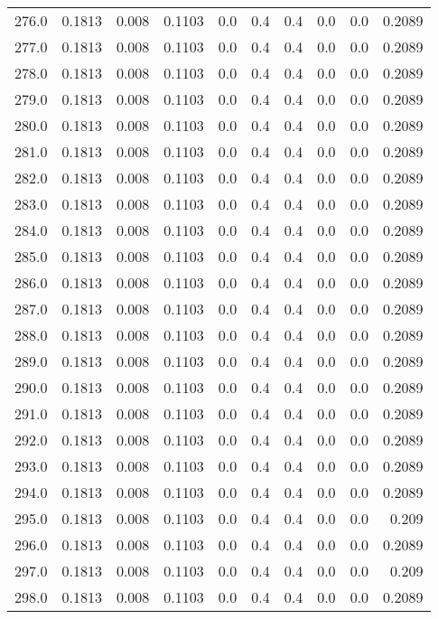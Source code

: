 \begin{longtable}{lrrrrrrrrr}
276.0 & 0.1813 & 0.008 & 0.1103 & 0.0 & 0.4 & 0.4 & 0.0 & 0.0 & 0.2089 \\
277.0 & 0.1813 & 0.008 & 0.1103 & 0.0 & 0.4 & 0.4 & 0.0 & 0.0 & 0.2089 \\
278.0 & 0.1813 & 0.008 & 0.1103 & 0.0 & 0.4 & 0.4 & 0.0 & 0.0 & 0.2089 \\
279.0 & 0.1813 & 0.008 & 0.1103 & 0.0 & 0.4 & 0.4 & 0.0 & 0.0 & 0.2089 \\
280.0 & 0.1813 & 0.008 & 0.1103 & 0.0 & 0.4 & 0.4 & 0.0 & 0.0 & 0.2089 \\
281.0 & 0.1813 & 0.008 & 0.1103 & 0.0 & 0.4 & 0.4 & 0.0 & 0.0 & 0.2089 \\
282.0 & 0.1813 & 0.008 & 0.1103 & 0.0 & 0.4 & 0.4 & 0.0 & 0.0 & 0.2089 \\
283.0 & 0.1813 & 0.008 & 0.1103 & 0.0 & 0.4 & 0.4 & 0.0 & 0.0 & 0.2089 \\
284.0 & 0.1813 & 0.008 & 0.1103 & 0.0 & 0.4 & 0.4 & 0.0 & 0.0 & 0.2089 \\
285.0 & 0.1813 & 0.008 & 0.1103 & 0.0 & 0.4 & 0.4 & 0.0 & 0.0 & 0.2089 \\
286.0 & 0.1813 & 0.008 & 0.1103 & 0.0 & 0.4 & 0.4 & 0.0 & 0.0 & 0.2089 \\
287.0 & 0.1813 & 0.008 & 0.1103 & 0.0 & 0.4 & 0.4 & 0.0 & 0.0 & 0.2089 \\
288.0 & 0.1813 & 0.008 & 0.1103 & 0.0 & 0.4 & 0.4 & 0.0 & 0.0 & 0.2089 \\
289.0 & 0.1813 & 0.008 & 0.1103 & 0.0 & 0.4 & 0.4 & 0.0 & 0.0 & 0.2089 \\
290.0 & 0.1813 & 0.008 & 0.1103 & 0.0 & 0.4 & 0.4 & 0.0 & 0.0 & 0.2089 \\
291.0 & 0.1813 & 0.008 & 0.1103 & 0.0 & 0.4 & 0.4 & 0.0 & 0.0 & 0.2089 \\
292.0 & 0.1813 & 0.008 & 0.1103 & 0.0 & 0.4 & 0.4 & 0.0 & 0.0 & 0.2089 \\
293.0 & 0.1813 & 0.008 & 0.1103 & 0.0 & 0.4 & 0.4 & 0.0 & 0.0 & 0.2089 \\
294.0 & 0.1813 & 0.008 & 0.1103 & 0.0 & 0.4 & 0.4 & 0.0 & 0.0 & 0.2089 \\
295.0 & 0.1813 & 0.008 & 0.1103 & 0.0 & 0.4 & 0.4 & 0.0 & 0.0 & 0.209 \\
296.0 & 0.1813 & 0.008 & 0.1103 & 0.0 & 0.4 & 0.4 & 0.0 & 0.0 & 0.2089 \\
297.0 & 0.1813 & 0.008 & 0.1103 & 0.0 & 0.4 & 0.4 & 0.0 & 0.0 & 0.209 \\
298.0 & 0.1813 & 0.008 & 0.1103 & 0.0 & 0.4 & 0.4 & 0.0 & 0.0 & 0.2089 \\

\end{longtable}
